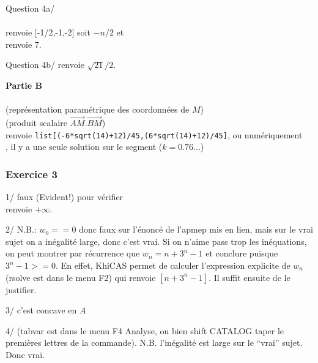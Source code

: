 \documentclass{article}
\begin{document}
\begin{giacjshere}
Question 4a/ \\
\\
 renvoie [-1/2,-1,-2] soit $-n/2$ et\\
 renvoie 7.

Question 4b/ 
 renvoie $\sqrt{21}/2$.

{\bf Partie B}\\
\\
 (représentation paramétrique des coordonnées de $M$)\\
 (produit scalaire
$\overrightarrow{AM}.\overrightarrow{BM}$)\\
 renvoie {\tt list[(-6*sqrt(14)+12)/45,(6*sqrt(14)+12)/45]}, ou numériquement\\
, il y a une seule solution sur le segment 
($k=0.76...$)

\subsubsection{Exercice 3}
1/ faux (Evident!) pour vérifier \\
 renvoie $+\infty$.

2/ N.B.: $w_0==0$ donc faux sur l'énoncé de l'apmep mis en lien, 
mais sur le vrai sujet on a inégalité large, donc c'est vrai.
Si on n'aime pass trop les inéquations, on peut montrer par récurrence que 
$w_n=n+3^n-1$ et conclure puisque $3^n-1>=0$.
En effet, KhiCAS permet de calculer l'expression explicite de $w_n$ \\
 (rsolve est dans
le menu F2) qui renvoie $[n+3^n-1]$. Il suffit ensuite de le justifier.

3/ c'est concave en $A$

4/  (tabvar est dans le menu F4 Analyse,
ou bien shift CATALOG taper le premières lettres de la commande).
N.B. l'inégalité est large sur le ``vrai'' sujet. Donc vrai.


\end{giacjshere}
\end{document}
